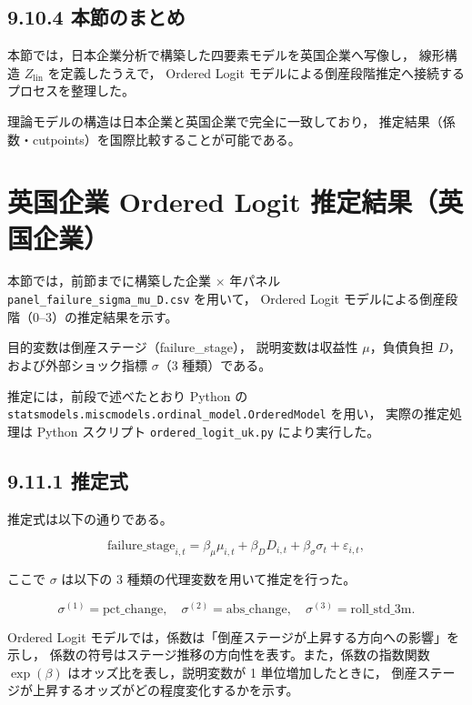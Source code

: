 \subsection*{9.10.4 本節のまとめ}

本節では，日本企業分析で構築した四要素モデルを英国企業へ写像し，
線形構造 $Z_{\text{lin}}$ を定義したうえで，
Ordered Logit モデルによる倒産段階推定へ接続するプロセスを整理した。

理論モデルの構造は日本企業と英国企業で完全に一致しており，
推定結果（係数・cutpoints）を国際比較することが可能である。


\section{英国企業 Ordered Logit 推定結果（英国企業）}

本節では，前節までに構築した企業 $\times$ 年パネル
\texttt{panel\_failure\_sigma\_mu\_D.csv} を用いて，
Ordered Logit モデルによる倒産段階（0--3）の推定結果を示す。

目的変数は倒産ステージ（failure\_stage），
説明変数は収益性 $\mu$，負債負担 $D$，および外部ショック指標 $\sigma$（3 種類）である。

推定には，前段で述べたとおり Python の
\texttt{statsmodels.miscmodels.ordinal\_model.OrderedModel} を用い，
実際の推定処理は Python スクリプト \texttt{ordered\_logit\_uk.py} により実行した。

\subsection*{9.11.1 推定式}

推定式は以下の通りである。



\[
\text{failure\_stage}_{i,t}
= \beta_\mu \mu_{i,t}
+ \beta_D D_{i,t}
+ \beta_\sigma \sigma_{t}
+ \varepsilon_{i,t},
\]



ここで $\sigma$ は以下の 3 種類の代理変数を用いて推定を行った。



\[
\sigma^{(1)} = \text{pct\_change},\quad
\sigma^{(2)} = \text{abs\_change},\quad
\sigma^{(3)} = \text{roll\_std\_3m}.
\]



Ordered Logit モデルでは，係数は「倒産ステージが上昇する方向への影響」を示し，
係数の符号はステージ推移の方向性を表す。また，係数の指数関数
$\exp(\beta)$ はオッズ比を表し，説明変数が 1 単位増加したときに，
倒産ステージが上昇するオッズがどの程度変化するかを示す。

